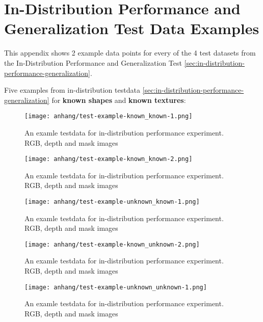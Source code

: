 \chapter{In-Distribution Performance and Generalization Test Data Examples}
\label{appendix:testdata-examples-in-distribution}

	This appendix shows 2 example data points for every of the 4 test datasets from the In-Distribution Performance and Generalization Test \ref{sec:in-distribution-performance-generalization}.
	
	Five examples from in-distribution testdata \ref{sec:in-distribution-performance-generalization} for \textbf{known shapes} and \textbf{known textures}:
	\begin{figure}[H]
		\centering
		\texttt{[image: anhang/test-example-known\_known-1.png]}
		\caption[An examle testdata for in-distribution performance experiment. RGB, depth and mask images]{An examle testdata for in-distribution performance experiment. RGB, depth and mask images}
	\end{figure}
	\begin{figure}[H]
		\centering
		\texttt{[image: anhang/test-example-known\_known-2.png]}
		\caption[An examle testdata for in-distribution performance experiment. RGB, depth and mask images]{An examle testdata for in-distribution performance experiment. RGB, depth and mask images}
	\end{figure}
	\begin{figure}[H]
		\centering
		\texttt{[image: anhang/test-example-unknown\_known-1.png]}
		\caption[An examle testdata for in-distribution performance experiment. RGB, depth and mask images]{An examle testdata for in-distribution performance experiment. RGB, depth and mask images}
	\end{figure}
	\begin{figure}[H]
		\centering
		\texttt{[image: anhang/test-example-known\_unknown-2.png]}
		\caption[An examle testdata for in-distribution performance experiment. RGB, depth and mask images]{An examle testdata for in-distribution performance experiment. RGB, depth and mask images}
	\end{figure}
	\begin{figure}[H]
		\centering
		\texttt{[image: anhang/test-example-unknown\_unknown-1.png]}
		\caption[An examle testdata for in-distribution performance experiment. RGB, depth and mask images]{An examle testdata for in-distribution performance experiment. RGB, depth and mask images}
	\end{figure}
